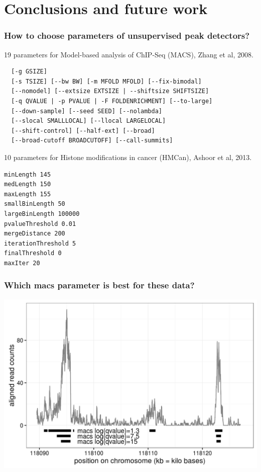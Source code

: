 \documentclass{beamer}
\begin{document}
\section{Conclusions and future work}

\begin{frame}[fragile]
  \frametitle{How to choose parameters of unsupervised peak
    detectors?}
\scriptsize
19 parameters for Model-based analysis of ChIP-Seq (MACS), Zhang et al, 2008.
\begin{verbatim}
  [-g GSIZE]
  [-s TSIZE] [--bw BW] [-m MFOLD MFOLD] [--fix-bimodal]
  [--nomodel] [--extsize EXTSIZE | --shiftsize SHIFTSIZE]
  [-q QVALUE | -p PVALUE | -F FOLDENRICHMENT] [--to-large]
  [--down-sample] [--seed SEED] [--nolambda]
  [--slocal SMALLLOCAL] [--llocal LARGELOCAL]
  [--shift-control] [--half-ext] [--broad]
  [--broad-cutoff BROADCUTOFF] [--call-summits]
\end{verbatim}
10 parameters for Histone modifications in cancer (HMCan),
Ashoor et al, 2013.
\begin{verbatim}
minLength 145
medLength 150
maxLength 155
smallBinLength 50
largeBinLength 100000
pvalueThreshold 0.01
mergeDistance 200
iterationThreshold 5
finalThreshold 0
maxIter 20
\end{verbatim}
\end{frame}

\begin{frame}
  \frametitle{Which macs parameter is best for these data?}
  \includegraphics[width=1\textwidth]{figure-macs-problem.png}
\end{frame}
\end{document}

